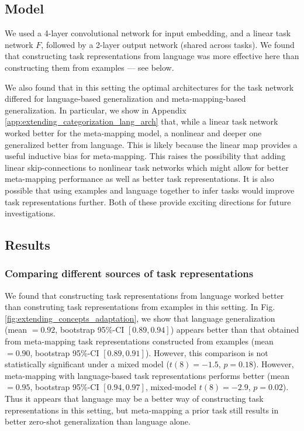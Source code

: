 \subsection{Model}
We used a 4-layer convolutional network for input embedding, and a linear task network \(F\), followed by a 2-layer output network (shared across tasks). We found that constructing task representations from language was more effective here than constructing them from examples --- see below. \par
We also found that in this setting the optimal architectures for the task network differed for language-based generalization and meta-mapping-based generalization. In particular, we show in Appendix \ref{app:extending_categorization_lang_arch} that, while a linear task network worked better for the meta-mapping model, a nonlinear and deeper one generalized better from language. This is likely because the linear map provides a useful inductive bias for meta-mapping. This raises the possibility that adding linear skip-connections to nonlinear task networks which might allow for better meta-mapping performance as well as better task representations. It is also possible that using examples and language together to infer tasks would improve task representations further. Both of these provide exciting directions for future investigations. \par 

\subsection{Results}

\subsubsection{Comparing different sources of task representations}
We found that constructing task representations from language worked better than construting task representations from examples in this setting. In Fig. \ref{fig:extending_concepts_adaptation}, we show that language generalization (mean \(= 0.92\), bootstrap 95\%-CI \([0.89, 0.94]\)) appears better than that obtained from meta-mapping task representations constructed from examples (mean \(= 0.90\), bootstrap 95\%-CI \([0.89, 0.91]\)). However, this comparison is not statistically significant under a mixed model (\(t(8) = -1.5\), \(p = 0.18\)). However, meta-mapping with language-based task representations performs better (mean \(= 0.95\), bootstrap 95\%-CI \([0.94, 0.97]\), mixed-model \(t(8) = -2.9\), \(p = 0.02\)). Thus it appears that language may be a better way of constructing task representations in this setting, but meta-mapping a prior task still results in better zero-shot generalization than language alone. \par

